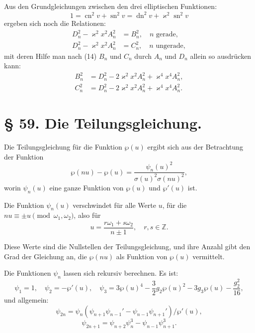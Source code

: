 \documentclass[12pt,a4paper]{article}
\theoremstyle{definition}
\begin{document}
Aus den Grundgleichungen zwischen den drei elliptischen
Funktionen:
\begin{equation}\tag{2}
1 = \operatorname{cn}^2 v + \operatorname{sn}^2 v = \operatorname{dn}^2 v + \varkappa^2\operatorname{sn}^2 v
\end{equation}
ergeben sich noch die Relationen:
\begin{equation}\tag{3}
\begin{aligned}
D_n^2 - \varkappa^2x^2 A_n^2 &= B_n^2, \quad n \text{ gerade}, \\
D_n^2 - \varkappa^2x^2 A_n^2 &= C_n^2, \quad n \text{ ungerade},
\end{aligned}
\end{equation}
mit deren Hilfe man nach (14) $B_n$ und $C_n$ durch $A_n$ und $D_n$
allein so ausdr\"{u}cken kann:
\begin{equation}\tag{4}
\begin{aligned}
B_n^2 &= D_n^2 - 2\varkappa^2x^2 A_n^2 + \varkappa^4x^4 A_n^2, \\
C_n^2 &= D_n^2 - 2\varkappa^2x^2 A_n^2 + \varkappa^4x^4 A_n^2.
\end{aligned}
\end{equation}

\section*{\S{} 59. Die Teilungsgleichung.}

Die Teilungsgleichung f\"{u}r die Funktion $\wp(u)$ ergibt sich
aus der Betrachtung der Funktion
\begin{equation}\tag{1}
\wp(nu) - \wp(u) = \frac{\psi_n(u)^2}{\sigma(u)^2\sigma(nu)^2},
\end{equation}
worin $\psi_n(u)$ eine ganze Funktion von $\wp(u)$ und $\wp'(u)$ ist.

Die Funktion $\psi_n(u)$ verschwindet f\"{u}r alle Werte $u$, f\"{u}r die
$nu \equiv \pm u \pmod{\omega_1, \omega_2}$, also f\"{u}r
\begin{equation}\tag{2}
u = \frac{r\omega_1 + s\omega_2}{n \pm 1}, \quad r, s \in \mathbb{Z}.\end{equation}

Diese Werte sind die Nullstellen der Teilungsgleichung, und
ihre Anzahl gibt den Grad der Gleichung an, die $\wp(nu)$ als
Funktion von $\wp(u)$ vermittelt.

Die Funktionen $\psi_n$ lassen sich rekursiv berechnen. Es ist:
\begin{equation}\tag{3}
\psi_1 = 1, \quad \psi_2 = -\wp'(u), \quad
\psi_3 = 3\wp(u)^4 - \frac{3}{2}g_2\wp(u)^2 - 3g_3\wp(u) - \frac{g_2^2}{16},
\end{equation}
und allgemein:
\begin{equation}\tag{4}
\psi_{2n} = \psi_n\left(\psi_{n+1}\psi_{n-1}' - \psi_{n-1}\psi_{n+1}'\right)/\wp'(u),
\end{equation}
\begin{equation}\tag{5}
\psi_{2n+1} = \psi_{n+2}\psi_n^3 - \psi_{n-1}\psi_{n+1}^3.
\end{equation}
\end{document}
